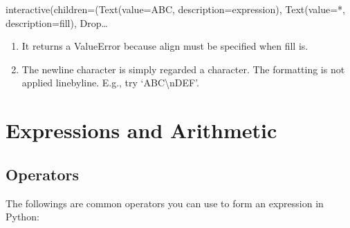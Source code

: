 \documentclass[letterpaper,10pt,english]{sphinxmanual}
\begin{document}
\begin{sphinxVerbatim}[commandchars=\\\{\}]
\end{sphinxVerbatim}

\begin{sphinxVerbatim}[commandchars=\\\{\}]
interactive(children=(Text(value=\PYGZdq{}\PYGZsq{}ABC\PYGZsq{}\PYGZdq{}, description=\PYGZsq{}expression\PYGZsq{}), Text(value=\PYGZsq{}*\PYGZsq{}, description=\PYGZsq{}fill\PYGZsq{}), Drop…
\end{sphinxVerbatim}
\begin{enumerate}
%
\item {} 
It returns a ValueError because align must be specified when fill is.

\item {} 
The newline character is simply regarded a character. The formatting is not applied line\sphinxhyphen{}by\sphinxhyphen{}line. E.g., try ‘ABC\textbackslash{}nDEF’.

\end{enumerate}


\chapter{Expressions and Arithmetic}
\label{\detokenize{Lecture2/Expressions and Arithmetic:expressions-and-arithmetic}}\label{\detokenize{Lecture2/Expressions and Arithmetic::doc}}

\section{Operators}
\label{\detokenize{Lecture2/Expressions and Arithmetic:operators}}
The followings are common operators you can use to form an expression in Python:
\end{document}
